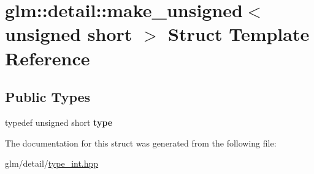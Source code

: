 \hypertarget{structglm_1_1detail_1_1make__unsigned_3_01unsigned_01short_01_4}{\section{glm\-:\-:detail\-:\-:make\-\_\-unsigned$<$ unsigned short $>$ Struct Template Reference}
\label{structglm_1_1detail_1_1make__unsigned_3_01unsigned_01short_01_4}
}
\subsection*{Public Types}
\begin{DoxyCompactItemize}
\item 
\hypertarget{structglm_1_1detail_1_1make__unsigned_3_01unsigned_01short_01_4_a42829000435f69c3a00675b6914f0d33}{typedef unsigned short {\bfseries type}}\label{structglm_1_1detail_1_1make__unsigned_3_01unsigned_01short_01_4_a42829000435f69c3a00675b6914f0d33}

\end{DoxyCompactItemize}


The documentation for this struct was generated from the following file\-:\begin{DoxyCompactItemize}
\item 
glm/detail/\hyperlink{type__int_8hpp}{type\-\_\-int.\-hpp}\end{DoxyCompactItemize}
